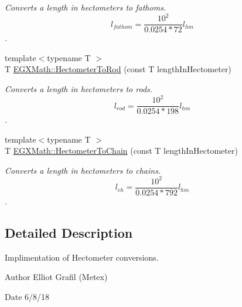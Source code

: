 \begin{DoxyCompactItemize}
\begin{DoxyCompactList}\small\item\em Converts a length in hectometers to fathoms. \[ l_{fathom}= \frac{10^{2}}{0.0254 * 72} l_{hm} \]. \end{DoxyCompactList}\item 
{\footnotesize template$<$typename T $>$ }\\T \mbox{\hyperlink{group___e_g_x_math-_conversions-_length_conversions-_s_i-_hectometer-_surveyors_gafdf1df626e4b3c88f88bd3d6d3545e7d}{E\+G\+X\+Math\+::\+Hectometer\+To\+Rod}} (const T length\+In\+Hectometer)
\begin{DoxyCompactList}\small\item\em Converts a length in hectometers to rods. \[ l_{rod}= \frac{10^{2}}{0.0254 * 198} l_{hm} \]. \end{DoxyCompactList}\item 
{\footnotesize template$<$typename T $>$ }\\T \mbox{\hyperlink{group___e_g_x_math-_conversions-_length_conversions-_s_i-_hectometer-_surveyors_ga02973091150445cfe5798389ecccdceb}{E\+G\+X\+Math\+::\+Hectometer\+To\+Chain}} (const T length\+In\+Hectometer)
\begin{DoxyCompactList}\small\item\em Converts a length in hectometers to chains. \[ l_{ch}= \frac{10^{2}}{0.0254 * 792} l_{hm} \]. \end{DoxyCompactList}\end{DoxyCompactItemize}


\subsection{Detailed Description}
Implimentation of Hectometer conversions. 

\begin{DoxyAuthor}{Author}
Elliot Grafil (Metex) 
\end{DoxyAuthor}
\begin{DoxyDate}{Date}
6/8/18 
\end{DoxyDate}
